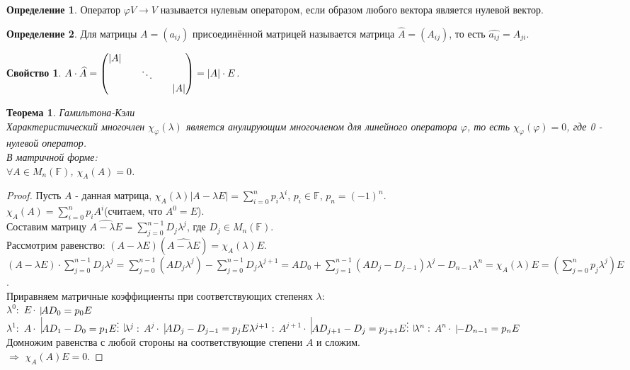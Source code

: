 \documentclass[a4paper, 12pt]{article}
\newcommand{\F}{\mathbb F}
\renewcommand{\phi}{\varphi}
\theoremstyle{definition}
\newtheorem*{definition}{Определение}
\theoremstyle{plain}
\newtheorem*{theorem}{Теорема}
\newtheorem*{properties1}{Свойство}
\theoremstyle{remark}
\begin{document}
  \begin{definition}
    Оператор $\phi V \to V$ называется нулевым оператором, если образом любого вектора является нулевой вектор.
  \end{definition}
  \begin{definition}
    Для матрицы $A = (a_{ij})$ присоединённой матрицей называется матрица $\widehat{A} = (A_{ij})$, то есть $\widehat{a_{ij}} = A_{ji}$.
  \end{definition}
  \begin{properties1}
    $A\cdot\widehat{A} = \begin{pmatrix}
      |A|\\
      \null && \ddots\\
      \null && \null && |A|
    \end{pmatrix} = |A|\cdot E$.
  \end{properties1}
  \begin{theorem} Гамильтона-Кэли\\
    Характеристический многочлен $\chi_{\phi}(\lambda)$ является анулирующим многочленом для линейного оператора $\phi$, то есть $\chi_{\phi}(\phi) = 0$, где 0 - нулевой оператор.\\
    В матричной форме:\\
    $\forall A\in M_n(\F)$, $\chi_{A}(A) = 0$.
  \end{theorem}
  \begin{proof}
    Пусть $A$ - данная матрица, $\chi_A(\lambda)|A-\lambda E| = \sum\limits_{i=0}^{n}p_i\lambda^i$, $p_i\in \F$, $p_n = (-1)^n$.\\
    $\chi_A(A) = \sum\limits_{i=0}^np_iA^i$(считаем, что $A^0 = E$).\\
    Составим матрицу $\widehat{A-\lambda E} = \sum\limits_{j=0}^{n-1}D_j\lambda^j$, где $D_j\in M_n(\F)$.\\
    Рассмотрим равенство: $(A-\lambda E)(\widehat{A-\lambda E}) = \chi_A(\lambda)E$.\\
    $(A-\lambda E)\cdot\sum\limits_{j=0}^{n-1}D_j\lambda^j = \sum\limits_{j=0}^{n-1}(AD_j\lambda^j)-\sum\limits_{j=0}^{n-1}D_j\lambda^{j+1} = AD_0+\sum\limits_{j=1}^{n-1}(AD_j-D_{j-1})\lambda^j-D_{n-1}\lambda^n = \chi_A(\lambda)E = (\sum\limits_{j=0}^{n}p_j\lambda^j)E$.\\
    \newpage
    Приравняем матричные коэффициенты при соответствующих степенях $\lambda$:\\
    $\lambda^0:$    $E\cdot$ $\vline AD_0 = p_0E$\\
    $\lambda^1:$    $A\cdot$ $\vline AD_1-D_0 = p_1E\\
    \vdots$          $\vline\\
    \lambda^j:$    $A^j\cdot$ $\vline AD_j -D_{j-1}= p_jE\\
    \lambda^{j+1}:$ $A^{j+1}\cdot$ $\vline AD_{j+1} -D_{j}= p_{j+1}E\\
    \vdots$                $\vline\\
    \lambda^n:$    $A^n\cdot$ $\vline -D_{n-1} = p_nE$\\
    Домножим равенства с любой стороны на соответствующие степени $A$ и сложим.\\
    $\Longrightarrow$ $\chi_A(A)E = 0$.
  \end{proof}
\end{document}
